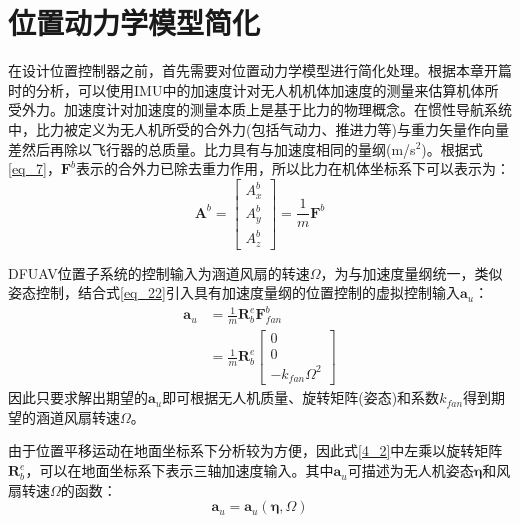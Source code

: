 \section{位置动力学模型简化}

在设计位置控制器之前，首先需要对位置动力学模型进行简化处理。根据本章开篇时的分析，可以使用IMU中的加速度计对无人机机体加速度的测量来估算机体所受外力。加速度计对加速度的测量本质上是基于比力的物理概念。在惯性导航系统中，比力被定义为无人机所受的合外力(包括气动力、推进力等)与重力矢量作向量差然后再除以飞行器的总质量。比力具有与加速度相同的量纲(m/s$^2$)。根据式\eqref{eq_7}，$\boldsymbol{F}^b$表示的合外力已除去重力作用，所以比力在机体坐标系下可以表示为：
\begin{equation}
    \boldsymbol{A}^b=
    \begin{bmatrix}
    A_x^b \\
    A_y^b \\
    A_z^b
    \end{bmatrix}=\frac{1}{m}\boldsymbol{F}^b
    \label{4_1}
\end{equation}

DFUAV位置子系统的控制输入为涵道风扇的转速$\Omega$，为与加速度量纲统一，类似姿态控制，结合式\eqref{eq_22}引入具有加速度量纲的位置控制的虚拟控制输入$\boldsymbol{a}_u$：
\begin{equation}
    \begin{aligned}
        \boldsymbol{a}_u&=\frac{1}{m}\boldsymbol{R}_b^e\boldsymbol{F}^b_{fan}\\
        &=\frac{1}{m}\boldsymbol{R}_b^e\begin{bmatrix}0 \\ 0 \\
            -k_{fan}\Omega^2
        \end{bmatrix}
    \end{aligned}
    \label{4_2}
\end{equation}
因此只要求解出期望的$\boldsymbol{a}_u$即可根据无人机质量、旋转矩阵(姿态)和系数$k_{fan}$得到期望的涵道风扇转速$\Omega$。

由于位置平移运动在地面坐标系下分析较为方便，因此式\eqref{4_2}中左乘以旋转矩阵$\boldsymbol{R}_b^e$，可以在地面坐标系下表示三轴加速度输入。其中$\boldsymbol{a}_u$可描述为无人机姿态$\boldsymbol{\eta}$和风扇转速$\Omega$的函数：
\begin{equation}
    \boldsymbol{a}_u=\boldsymbol{a}_u(\boldsymbol{\eta},\Omega)
    \label{4_3}
\end{equation}

